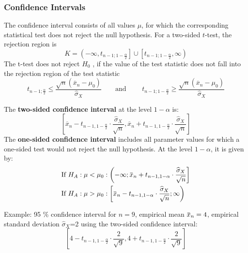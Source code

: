 \documentclass[11pt]{article}
\newcommand*\samplemean[1]{\overline{#1}}
\newcommand{\overbar}[1]{\mkern 1.5mu\overline{\mkern-1.5mu#1\mkern-1.5mu}\mkern 1.5mu}
\begin{document}
\subsubsection{Confidence Intervals}
The confidence interval consists of all values $\mu$, for which the corresponding statistical test does not reject the null hypothesis. For a two-sided $t$-test, the rejection region is
\begin{equation*}
	K = \left( -\infty, t_{n-1; 1-\frac{\alpha}{2}} \right] \cup \left[ t_{n-1; 1- \frac{\alpha}{2}}, \infty \right)
\end{equation*}
The t-test does not reject $H_0$ , if the value of the test statistic does not fall into the rejection region of the test statistic
\begin{equation*}
	t_{n-1; \frac{\alpha}{2}} \leq \frac{\sqrt{n}(\samplemean{x}_n - \mu_0)}{\widehat{\sigma}_X} \qquad	\text{and } \qquad
	t_{n-1; 1 - \frac{\alpha}{2}} \geq \frac{\sqrt{n}(\samplemean{x}_n - \mu_0)}{\widehat{\sigma}_X}
\end{equation*}

\begin{definition}
	The \textbf{two-sided confidence interval} at the level $1-\alpha$ is:
	\begin{equation*}
		\left[ \samplemean{x}_n - t_{n-1,1-\frac{\alpha}{2}}\cdot\frac{\widehat{\sigma}_X}{\sqrt{n}}, \samplemean{x}_n + t_{n-1,1-\frac{\alpha}{2}}\cdot\frac{\widehat{\sigma}_X}{\sqrt{n}} \right]
	\end{equation*}
	The \textbf{one-sided confidence interval} includes all parameter values for which a one-sided test would not reject the null hypothesis. At the level $1 - \alpha$, it is given by:
	\begin{align*}
		\text{If } H_A: \mu < \mu_0 &: \left(- \infty;\overbar{x}_n + t_{n-1,1-\alpha}\cdot \dfrac{\widehat{\sigma}_X}{\sqrt{n}} \right]\\
		\text{If } H_A: \mu > \mu_0 &: \left[\overbar{x}_n - t_{n-1,1-\alpha} \cdot \dfrac{\widehat{\sigma}_X}{\sqrt{n}};\infty \right)
	\end{align*}
\end{definition}

\noindent
Example: 95 \% confidence interval for $n=9$, empirical mean $\overbar{x}_n=4$, empirical standard deviation $\widehat{\sigma}_X$=2 using the two-sided confidence interval:
\begin{equation*}
	\left[4-t_{n-1,1-\frac{\alpha}{2}}\cdot\frac{2}{\sqrt{9}}, 4+t_{n-1,1-\frac{\alpha}{2}}\cdot\frac{2}{\sqrt{9}} \right]
\end{equation*}
\end{document}
